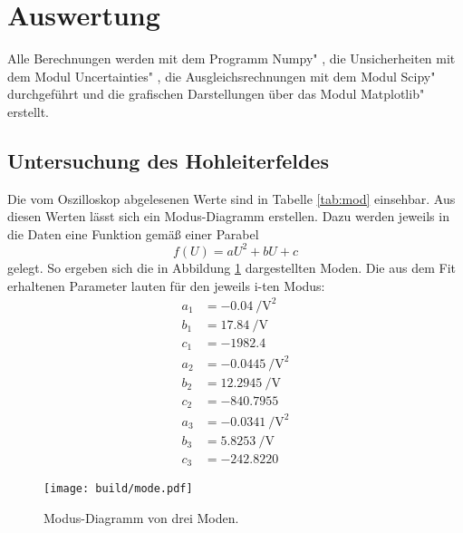 \section{Auswertung}
\label{sec:Auswertung}
Alle Berechnungen werden mit dem Programm \glqq Numpy" \cite{numpy}, die Unsicherheiten mit dem Modul \glqq Uncertainties" \cite{uncertainties}, die Ausgleichsrechnungen mit dem Modul \glqq Scipy" \cite{scipy} durchgeführt und die grafischen Darstellungen über das Modul \glqq Matplotlib" \cite{matplotlib} erstellt.


\subsection{Untersuchung des Hohleiterfeldes}

Die vom Oszilloskop abgelesenen Werte sind in Tabelle \ref{tab:mod} einsehbar. 
Aus diesen Werten lässt sich ein Modus-Diagramm erstellen. Dazu werden jeweils in die Daten eine Funktion gemäß einer Parabel
\begin{equation}
    f(U) = aU^2+bU+c
\end{equation}
gelegt. 
So ergeben sich die in Abbildung \ref{fig:mode} dargestellten Moden. Die aus dem Fit erhaltenen Parameter lauten für den jeweils i-ten Modus:
\begin{align*}
    a_1 & = \SI{-0.04}{\per\square\volt} \\
    b_1 & = \SI{17.84}{\per\volt} \\
    c_1 & = \num{-1982.4} \\
    a_2 & = \SI{-0.0445}{\per\square\volt} \\
    b_2 & = \SI{ 12.2945}{\per\volt} \\
    c_2 & = \num{-840.7955} \\
    a_3 & = \SI{-0.0341}{\per\square\volt} \\
    b_3 & = \SI{5.8253}{\per\volt} \\
    c_3 & = \num{-242.8220}
\end{align*}


\begin{figure}
    \centering
    \texttt{[image: build/mode.pdf]}
    \caption{Modus-Diagramm von drei Moden.}
    \label{fig:mode}
\end{figure}



